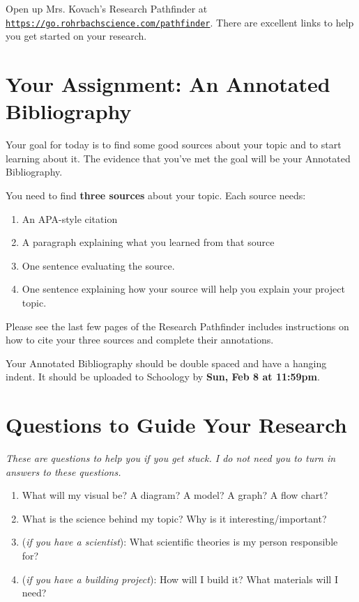 \documentclass[10pt]{exam}
\begin{document}
Open up Mrs. Kovach's Research Pathfinder at \texttt{\href{https://go.rohrbachscience.com/pathfinder}{https://go.rohrbachscience.com/pathfinder}}.  There are excellent links to help you get started on your research.  

\section*{Your Assignment: An Annotated Bibliography}

Your goal for today is to find some good sources about your topic and to start learning about it.  The evidence that you've met the goal will be your Annotated Bibliography.

\vspace{1em}

\noindent
You need to find {\bf three sources} about your topic. Each source needs:
%
\begin{enumerate}
  \item An APA-style citation
  \item A paragraph explaining what you learned from that source
  \item One sentence evaluating the source.
  \item One sentence explaining how your source will help you explain your project topic.
\end{enumerate}
%
Please see the last few pages of the Research Pathfinder includes instructions on how to cite your three sources and complete their annotations.

\vspace{1em}

\noindent
Your Annotated Bibliography should be double spaced and have a hanging indent. It should be uploaded to Schoology by {\bf Sun, Feb 8 at 11:59pm}. 


\section*{Questions to Guide Your Research}

\emph{These are questions to help you if you get stuck.  I do not need you to turn in answers to these questions.}

\begin{enumerate}
  \item What will my visual be?  A diagram? A model? A graph? A flow chart?
  \item What is the science behind my topic?  Why is it interesting/important?
  \item (\emph{if you have a scientist}): What scientific theories is my person responsible for?
  \item (\emph{if you have a building project}): How will I build it?  What materials will I need?
\end{enumerate}
\end{document}
